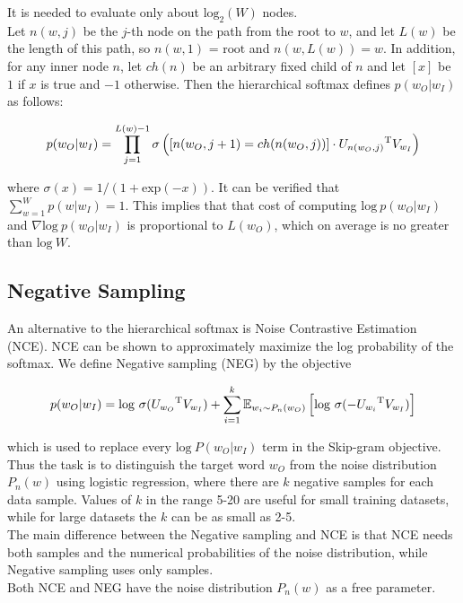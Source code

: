 It is needed to evaluate only about $\mathrm{log}_2(W)$ nodes.\\

Let $n(w,j)$ be the $j$-th node on the path from the root to $w$, and let $L(w)$ be the length of this path, so $n(w,1)$ = $\mathrm{root}$ and $n(w,L(w)) = w$. In addition, for any inner node $n$, let $ch(n)$ be an arbitrary fixed child of $n$ and let $[x]$ be $1$ if $x$ is true and $-1$ otherwise. Then the hierarchical softmax defines $p(w_O|w_I)$ as follows:

$$p(w_O|w_I)=\prod_{j=1}^{L(w)-1}\sigma\left(\left[n(w_O,j+1)=ch(n(w_O,j))\right]\cdot {U_{n(w_O,j)}}^{\rm T}V_{w_I}\right)$$

where $\sigma(x) = 1/(1+\mathrm{exp}(-x))$. It can be verified that $\sum_{w=1}^W p(w|w_I)=1$. This implies that that cost of computing $\mathrm{log}\ p(w_O|w_I)$ and $\nabla\mathrm{log}\ p(w_O|w_I)$ is proportional to $L(w_O)$, which on average is no greater than $\mathrm{log}\ W$.

\subsection{Negative Sampling}

An alternative to the hierarchical softmax is Noise Contrastive Estimation (NCE). NCE can be shown to approximately maximize the log probability of the softmax. We define Negative sampling (NEG) by the objective

$$p(w_O|w_I)=\mathrm{log}\ \sigma({U_{w_O}}^{\rm T}V_{w_I})+\sum_{i=1}^k\mathbb{E}_{w_i\sim P_n(w_O)}\left[\mathrm{log}\ \sigma(-{U_{w_i}}^{\rm T}V_{w_I})\right]$$

which is used to replace every $\mathrm{log}\ P(w_O|w_I)$ term in the Skip-gram objective. Thus the task is to distinguish the target word $w_O$ from the noise distribution $P_n(w)$ using logistic regression, where there are $k$ negative samples for each data sample. Values of $k$ in the range 5-20 are useful for small training datasets, while for large datasets the $k$ can be as small as 2-5.\\

The main difference between the Negative sampling and NCE is that NCE needs both samples and the numerical probabilities of the noise distribution, while Negative sampling uses only samples.\\

Both NCE and NEG have the noise distribution $P_n(w)$ as a free parameter.

